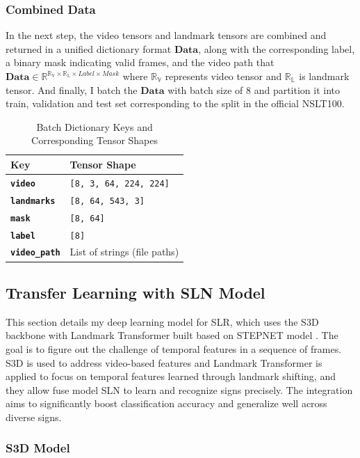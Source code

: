 \documentclass{article}
\begin{document}
\subsubsection{Combined Data}
In the next step, the video tensors and landmark tensors are combined and returned in a unified dictionary format $\mathbf{Data}$, along with the corresponding label, a binary mask indicating valid frames, and the video path that $\mathbf{Data} \in \mathbb{R}^{\mathbb{R_V} \times \mathbb{R_L} \times Label \times Mask}$ where $\mathbb{R_V}$ represents video tensor and $\mathbb{R_L}$ is landmark tensor. And finally, I batch the $\mathbf{Data}$ with batch size of 8 and partition it into train, validation and test set corresponding to the split in the official NSLT100.

\begin{table}[h]
\centering
\renewcommand{\arraystretch}{1.3}
\begin{tabular}{|>{\bfseries}l|l|}
\hline
\textbf{Key} & \textbf{Tensor Shape} \\
\hline
\texttt{video} & \texttt{[8, 3, 64, 224, 224]} \\
\hline
\texttt{landmarks} & \texttt{[8, 64, 543, 3]} \\
\hline
\texttt{mask} & \texttt{[8, 64]} \\
\hline
\texttt{label} & \texttt{[8]} \\
\hline
\texttt{video\_path} & List of strings (file paths) \\
\hline
\end{tabular}
\caption{Batch Dictionary Keys and Corresponding Tensor Shapes}
\end{table}

\subsection{Transfer Learning with SLN Model}
This section details my deep learning model for SLR, which uses the S3D backbone \cite{xie2017rethinking} with Landmark Transformer built based on STEPNET model \cite{pan2022stepnet}. The goal is to figure out the challenge of temporal features in a sequence of frames. S3D is used to address video-based features and Landmark Transformer is applied to focus on temporal features learned through landmark shifting, and they allow fuse model SLN to learn and recognize signs precisely. The integration aims to significantly boost classification accuracy and generalize well across diverse signs.

\subsubsection{S3D Model}
\end{document}
